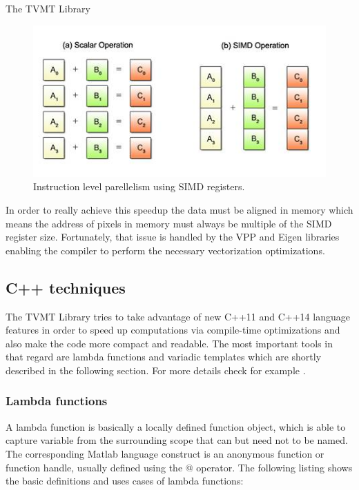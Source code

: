 \begin{chapter}{The TVMT Library}
\begin{figure}[h!]
        \centering
	    \includegraphics[width=0.7\linewidth]{./figures/library/simd.jpg}
	\caption[SIMD parallelization]{Instruction level parellelism using SIMD registers.
	}
	\label{fig:simd}
\end{figure}

In order to really achieve this speedup the data must be aligned in memory which means the address of pixels in memory must always be multiple of the SIMD register size. Fortunately,
that issue is handled by the VPP and Eigen libraries enabling the compiler to perform the necessary vectorization optimizations.



\subsection{C++ techniques} %
\label{sub:C++ techniques}
The TVMT Library tries to take advantage of new C++11 and C++14 language features in order to speed up computations via compile-time optimizations and also make the code
more compact and readable. The most important tools in that regard are lambda functions and variadic templates which are shortly described in the following section.
For more details check for example \cite{CPPEleven}.

\subsubsection{Lambda functions} %
\label{ssub:Lambda functions}
A lambda function is basically a locally defined function object, which is able to capture variable from the surrounding scope that can but need not to be named.
The corresponding Matlab language construct is an anonymous function or function handle, usually defined using the @ operator. The following listing
shows the basic definitions and uses cases of lambda functions:\\


\end{chapter}
